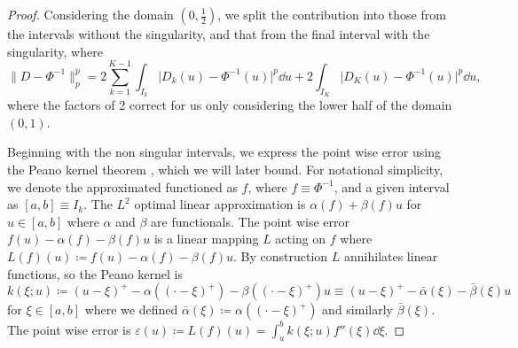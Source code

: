 \documentclass[manuscript,review]{acmart}
\begin{document}
\begin{proof}
Considering the domain $ (0, \tfrac{1}{2}) $, we split the contribution into those from the intervals without the singularity, and that from the final interval with the singularity, where
\begin{equation*}
\lVert D - \Phi^{-1}\rVert_p^p   = 2  \sum_{k=1}^{K-1} \int_{I_k} \lvert D_k(u) - \Phi^{-1}(u)\rvert^p \dd{u}  + 2 \int_{I_K} \lvert D_K(u) - \Phi^{-1}(u)\rvert^p \dd{u},
\end{equation*}
where the factors of 2 correct for us only considering the lower half of the domain $ (0, 1) $. 

Beginning with the non singular intervals, we express the point wise error using the Peano kernel theorem \citep{iserles2009first,powell1981approximation}, which we will later bound. For notational simplicity, we denote the approximated functioned as $ f $, where $ f \equiv \Phi^{-1} $, and a given interval as $ [a,b] \equiv I_k  $. The $ L^2 $ optimal linear approximation is $ \alpha(f) + \beta(f) u $ for $ u \in [a,b] $ where $ \alpha $ and $ \beta $ are functionals. The point wise error $ f(u) - \alpha(f) - \beta(f)u $ is a linear mapping $ L $ acting on $ f $ where $ L(f)(u) \coloneqq  f(u) - \alpha(f) - \beta(f)u $. By construction $ L $ annihilates linear functions, so the Peano kernel is $ k(\xi; u) \coloneqq (u - \xi)^+ - \alpha((\cdot - \xi)^+) - \beta((\cdot - \xi)^+)u \equiv (u - \xi)^+ - \bar{\alpha}(\xi) - \bar{\beta}(\xi)u $ for $ \xi \in [a,b] $ where we defined $ \bar{\alpha}(\xi) \coloneqq \alpha((\cdot - \xi)^+) $ and similarly $ \bar{\beta}(\xi) $. The point wise error is $ \varepsilon(u) \coloneqq L(f)(u) = \int_{a}^{b} k(\xi; u) f''(\xi) \dd{\xi} $.


\end{proof}
\end{document}
